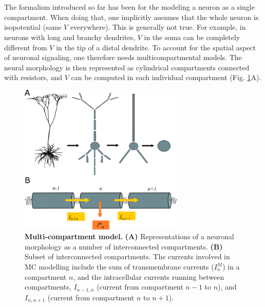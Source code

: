 \section{}
\label{sec:Neuron:morphology}
The formalism introduced so far has been for the modeling a neuron as a single compartment. When doing that, one implicitly assumes that the whole neuron is isopotential (same $V$ everywhere). This is generally not true. For example, in neurons with long and branchy dendrites, $V$ in the soma can be completely different from $V$ in the tip of a distal dendrite. To account for the spatial aspect of neuronal signaling, one therefore needs multicompartmental models. The neural morphology is then represented as cylindrical compartments connected with resistors, and $V$ can be computed in each individual compartment (Fig. \ref{Neuron:fig:multikompisen}A). 

\begin{figure}[!ht]
\begin{center}
\includegraphics[width=0.7\textwidth]{Figures/Neuron/multikompis.png}
\end{center}
\caption{\textbf{Multi-compartment model.} {\bf (A)} Representations of a neuronal morphology as a number of interconnected compartments. {\bf (B)} Subset of interconnected compartments. The currents involved in MC modelling include the sum of transmembrane currents ($I^M_n$) in a compartment $n$, and the intracellular currents running between 
compartments, $I_{n-1,n}$ (current from compartment $n-1$ to $n$), and $I_{n,n+1}$ (current from compartment $n$ to $n+1$).}
\label{Neuron:fig:multikompisen}
\end{figure}

